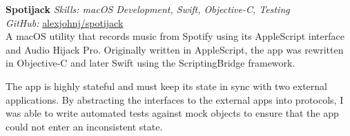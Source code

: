 \textbf{Spotijack}  \newline
\textit{Skills: macOS Development, Swift, Objective-C, Testing}\\
\textit{GitHub:} \href{https://github.com/\myweb/spotijack}{alexjohnj/spotijack}\\
A macOS utility that records music from Spotify using its AppleScript interface
and Audio Hijack Pro. Originally written in AppleScript, the app was rewritten
in Objective-C and later Swift using the ScriptingBridge framework.

The app is highly stateful and must keep its state in sync with two external
applications. By abstracting the interfaces to the external apps into protocols,
I was able to write automated tests against mock objects to ensure that the app
could not enter an inconsistent state.


